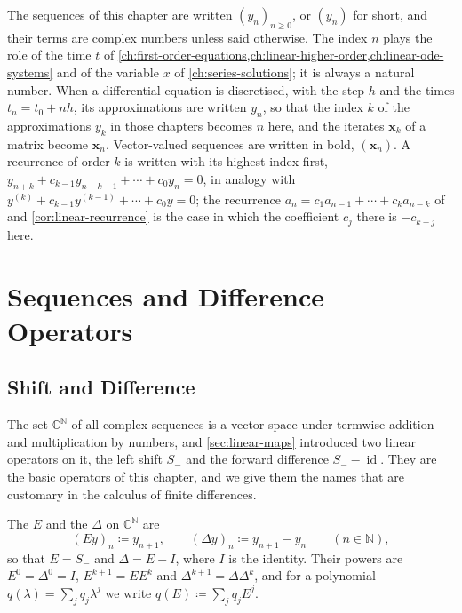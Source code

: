 The sequences of this chapter are written $(y_n)_{n\ge0}$, or $(y_n)$ for short, and their terms are complex numbers unless said otherwise. The index $n$ plays the role of the time $t$ of \cref{ch:first-order-equations,ch:linear-higher-order,ch:linear-ode-systems} and of the variable $x$ of \cref{ch:series-solutions}; it is always a natural number. When a differential equation is discretised, with the step $h$ and the times $t_n=t_0+nh$, its approximations are written $y_n$, so that the index $k$ of the approximations $y_k$ in those chapters becomes $n$ here, and the iterates $\mathbf x_k$ of a matrix become $\mathbf x_n$. Vector-valued sequences are written in bold, $(\mathbf x_n)$. A recurrence of order $k$ is written with its highest index first, $y_{n+k}+c_{k-1}y_{n+k-1}+\cdots+c_0y_n=0$, in analogy with $y^{(k)}+c_{k-1}y^{(k-1)}+\cdots+c_0y=0$; the recurrence $a_n=c_1a_{n-1}+\cdots+c_ka_{n-k}$ of  and \cref{cor:linear-recurrence} is the case in which the coefficient $c_j$ there is $-c_{k-j}$ here.

\section{Sequences and Difference Operators}
\label{sec:difference-operators}

\subsection{Shift and Difference}

The set $\mathbb C^{\mathbb N}$ of all complex sequences is a vector space under termwise addition and multiplication by numbers, and \cref{sec:linear-maps} introduced two linear operators on it, the left shift $S_-$ and the forward difference $S_--\operatorname{id}$. They are the basic operators of this chapter, and we give them the names that are customary in the calculus of finite differences.

\begin{definition}
\label{def:shift-difference}
The  $E$ and the  $\Delta$ on $\mathbb C^{\mathbb N}$ are
\[
(Ey)_n\coloneqq y_{n+1},\qquad(\Delta y)_n\coloneqq y_{n+1}-y_n\qquad(n\in\mathbb N),
\]
so that $E=S_-$ and $\Delta=E-I$, where $I$ is the identity. Their powers are $E^0=\Delta^0=I$, $E^{k+1}=EE^k$ and $\Delta^{k+1}=\Delta\Delta^k$, and for a polynomial $q(\lambda)=\sum_jq_j\lambda^j$ we write $q(E)\coloneqq\sum_jq_jE^j$.
\end{definition}

